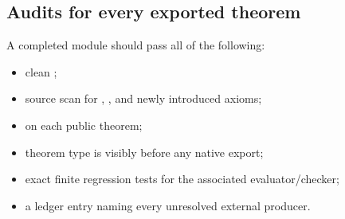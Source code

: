 \subsection{Audits for every exported theorem}

A completed module should pass all of the following:

\begin{itemize}
\item clean ;
\item source scan for , , and newly introduced axioms;
\item {} on each public theorem;
\item theorem type is visibly  before any native export;
\item exact finite regression tests for the associated evaluator/checker;
\item a ledger entry naming every unresolved external producer.
\end{itemize}
